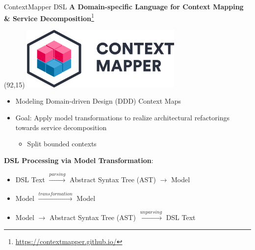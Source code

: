\documentclass[10pt]{beamer}
\begin{document}
\begin{frame}{ContextMapper DSL \cite{contextmapper}}
	\textbf{A Domain-specific Language for Context Mapping \linebreak \& Service Decomposition}\footnote{\url{https://contextmapper.github.io/}}
	
	\begin{textblock}{20}(92,15)
		\includegraphics[scale=0.3]{./images/cm-logo-github.png}
    \end{textblock}	
	
	\begin{itemize}
		\item Modeling Domain-driven Design (DDD) Context Maps
		\item Goal: Apply model transformations to realize architectural refactorings \cite{ZimmermannArchitecturalRefactorings} towards service decomposition
		\begin{itemize}
			\item Split bounded contexts
		\end{itemize}
	\end{itemize}
	
	\textbf{DSL Processing via Model Transformation}:
	\begin{itemize}
		\item DSL Text $\xrightarrow{parsing}$ Abstract Syntax Tree (AST) $\xrightarrow{}$ Model
		\item Model $\xrightarrow{transformation}$ Model
		\item Model $\xrightarrow{}$ Abstract Syntax Tree (AST) $\xrightarrow{unparsing}$ DSL Text
	\end{itemize}
\end{frame}
\end{document}
